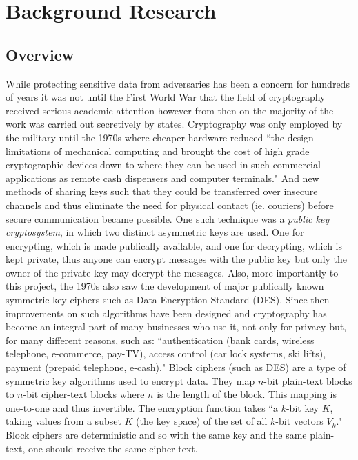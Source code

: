 \documentclass[10pt, titlepage]{article}
\begin{document}
\section{Background Research}
\subsection{Overview}
While protecting sensitive data from adversaries has been a concern for hundreds of years it was not until the First World War that the field of cryptography received serious academic attention however from then on the majority of the work was carried out secretively by states.\cite{appliedCryptoBook} Cryptography was only employed by the military until the 1970s where cheaper hardware reduced ``the design limitations of mechanical computing and brought the cost of high grade cryptographic devices down to where they can be used in such commercial applications as remote cash dispensers and computer terminals.\cite{newCryptoDirections}" And new methods of sharing keys such that they could be transferred over insecure channels and thus eliminate the need for physical contact (ie. couriers) before secure communication became possible. One such technique was a \textit{public key cryptosystem}, in which two distinct asymmetric keys are used. One for encrypting, which is made publically available, and one for decrypting, which is kept private, thus anyone can encrypt messages with the public key but only the owner of the private key may decrypt the messages. Also, more importantly to this project, the 1970s also saw the development of major publically known symmetric key ciphers such as Data Encryption Standard (DES). Since then improvements on such algorithms have been designed and cryptography has become an integral part of many businesses who use it, not only for privacy but, for many different reasons, such as: ``authentication (bank cards, wireless telephone, e-commerce, pay-TV), access control (car lock systems, ski lifts), payment (prepaid telephone, e-cash)."\cite{classicalCryptoBook}
\newline \indent Block ciphers (such as DES) are a type of symmetric key algorithms used to encrypt data. They map $n$-bit plain-text blocks to $n$-bit cipher-text blocks where $n$ is the length of the block. This mapping is one-to-one and thus invertible. The encryption function takes ``a $k$-bit key $K$, taking values from a subset $K$ (the key space) of the set of all $k$-bit vectors $V_{k}$." \cite{blockCiphers} Block ciphers are deterministic and so with the same key and the same plain-text, one should receive the same cipher-text.
\end{document}
